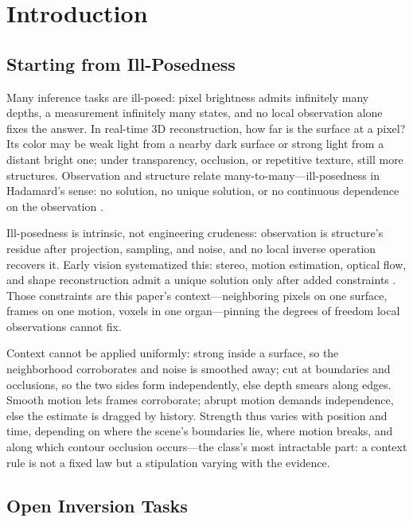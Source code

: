 \section{Introduction}
\label{ch:intro}

\subsection{Starting from Ill-Posedness}

Many inference tasks are ill-posed: pixel brightness admits infinitely many depths, a measurement infinitely many states, and no local observation alone fixes the answer. In real-time 3D reconstruction, how far is the surface at a pixel? Its color may be weak light from a nearby dark surface or strong light from a distant bright one; under transparency, occlusion, or repetitive texture, still more structures. Observation and structure relate many-to-many---ill-posedness in Hadamard's sense: no solution, no unique solution, or no continuous dependence on the observation \citep{hadamard1902}.

Ill-posedness is intrinsic, not engineering crudeness: observation is structure's residue after projection, sampling, and noise, and no local inverse operation recovers it. Early vision systematized this: stereo, motion estimation, optical flow, and shape reconstruction admit a unique solution only after added constraints \citep{poggio1985}. Those constraints are this paper's context---neighboring pixels on one surface, frames on one motion, voxels in one organ---pinning the degrees of freedom local observations cannot fix.

Context cannot be applied uniformly: strong inside a surface, so the neighborhood corroborates and noise is smoothed away; cut at boundaries and occlusions, so the two sides form independently, else depth smears along edges. Smooth motion lets frames corroborate; abrupt motion demands independence, else the estimate is dragged by history. Strength thus varies with position and time, depending on where the scene's boundaries lie, where motion breaks, and along which contour occlusion occurs---the class's most intractable part: a context rule is not a fixed law but a stipulation varying with the evidence.

\subsection{Open Inversion Tasks}


